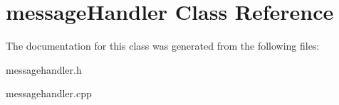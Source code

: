 \hypertarget{classmessageHandler}{}\section{message\+Handler Class Reference}
\label{classmessageHandler}


The documentation for this class was generated from the following files\+:\begin{DoxyCompactItemize}
\item 
messagehandler.\+h\item 
messagehandler.\+cpp\end{DoxyCompactItemize}
